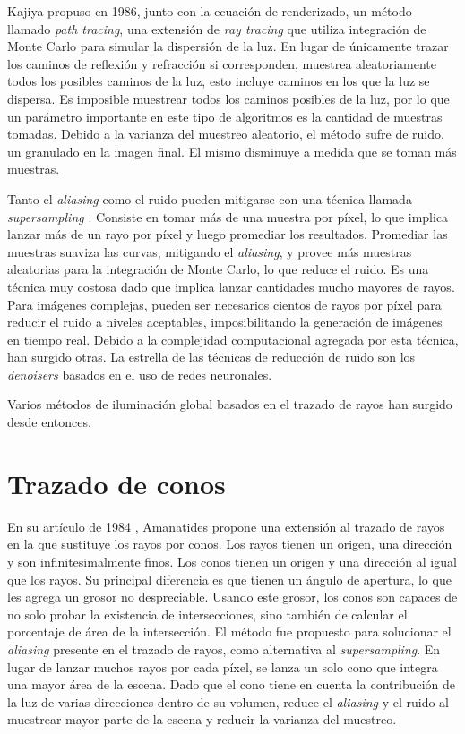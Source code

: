 Kajiya propuso en 1986\cite{rendering-equation}, junto con la ecuación de renderizado, un método llamado \textit{path tracing}, una extensión de \textit{ray tracing} que utiliza integración de Monte Carlo para simular la dispersión de la luz.
En lugar de únicamente trazar los caminos de reflexión y refracción si corresponden, muestrea aleatoriamente todos los posibles caminos de la luz, esto incluye caminos en los que la luz se dispersa.
Es imposible muestrear todos los caminos posibles de la luz, por lo que un parámetro importante en este tipo de algoritmos es la cantidad de muestras tomadas.
Debido a la varianza del muestreo aleatorio, el método sufre de ruido, un granulado en la imagen final.
El mismo disminuye a medida que se toman más muestras.


Tanto el \textit{aliasing} como el ruido pueden mitigarse con una técnica llamada \textit{supersampling} \cite{whitted-1980}. %
Consiste en tomar más de una muestra por píxel, lo que implica lanzar más de un rayo por píxel y luego promediar los resultados.
Promediar las muestras suaviza las curvas, mitigando el \textit{aliasing}, y provee más muestras aleatorias para la integración de Monte Carlo, lo que reduce el ruido.
Es una técnica muy costosa dado que implica lanzar cantidades mucho mayores de rayos.
Para imágenes complejas, pueden ser necesarios cientos de rayos por píxel para reducir el ruido a niveles aceptables, imposibilitando la generación de imágenes en tiempo real.
Debido a la complejidad computacional agregada por esta técnica, han surgido otras.
La estrella de las técnicas de reducción de ruido son los \textit{denoisers} basados en el uso de redes neuronales. %

Varios métodos de iluminación global basados en el trazado de rayos han surgido desde entonces.

\section{Trazado de conos}\label{sec:historical-cone-tracing}

En su artículo de 1984 \cite{ray-tracing-with-cones}, Amanatides propone una extensión al trazado de rayos en la que sustituye los rayos por conos.
Los rayos tienen un origen, una dirección y son infinitesimalmente finos.
Los conos tienen un origen y una dirección al igual que los rayos.
Su principal diferencia es que tienen un ángulo de apertura, lo que les agrega un grosor no despreciable.
Usando este grosor, los conos son capaces de no solo probar la existencia de intersecciones, sino también de calcular el porcentaje de área de la intersección.
El método fue propuesto para solucionar el \textit{aliasing} presente en el trazado de rayos, como alternativa al \textit{supersampling}.
En lugar de lanzar muchos rayos por cada píxel, se lanza un solo cono que integra una mayor área de la escena.
Dado que el cono tiene en cuenta la contribución de la luz de varias direcciones dentro de su volumen, reduce el \textit{aliasing} y el ruido al muestrear mayor parte de la escena y reducir la varianza del muestreo.

